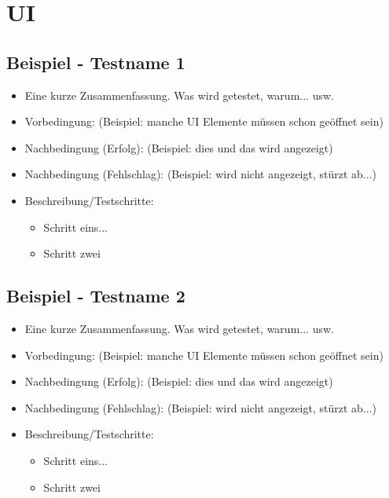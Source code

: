 \documentclass[qualitaetssicherung.tex]{subfiles}
\begin{document}
\section{UI}

	\subsection{Beispiel - Testname 1}
		\begin{itemize}
			\item
			Eine kurze Zusammenfassung. Was wird getestet, warum... usw.
			\item
			Vorbedingung: (Beispiel: manche UI Elemente müssen schon geöffnet sein)
			\item
			Nachbedingung (Erfolg): (Beispiel: dies und das wird angezeigt)
			\item
			Nachbedingung (Fehlschlag): (Beispiel: wird nicht angezeigt, stürzt ab...)
			\item
			Beschreibung/Testschritte:
			\begin{itemize}
				\item
				Schritt eins...
				\item
				Schritt zwei
			\end{itemize}
		\end{itemize}
		
	\subsection{Beispiel - Testname 2}
		\begin{itemize}
			\item
			Eine kurze Zusammenfassung. Was wird getestet, warum... usw.
			\item
			Vorbedingung: (Beispiel: manche UI Elemente müssen schon geöffnet sein)
			\item
			Nachbedingung (Erfolg): (Beispiel: dies und das wird angezeigt)
			\item
			Nachbedingung (Fehlschlag): (Beispiel: wird nicht angezeigt, stürzt ab...)
			\item
			Beschreibung/Testschritte:
			\begin{itemize}
				\item
				Schritt eins...
				\item
				Schritt zwei
			\end{itemize}
		\end{itemize}
\end{document}
